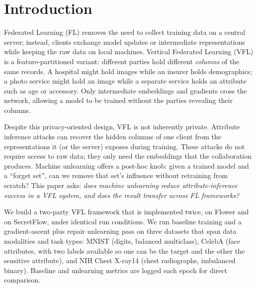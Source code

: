 \documentclass[sigconf,anonymous]{acmart}
\begin{document}


\maketitle

\section{Introduction}
Federated Learning (FL) removes the need to collect training data on a central server; instead, clients exchange model updates or intermediate representations while keeping the raw data on local machines. Vertical Federated Learning (VFL) is a feature-partitioned variant: different parties hold different \emph{columns} of the same records. A hospital might hold images while an insurer holds demographics; a photo service might hold an image while a separate service holds an attribute such as age or accessory. Only intermediate embeddings and gradients cross the network, allowing a model to be trained without the parties revealing their columns.

Despite this privacy-oriented design, VFL is not inherently private. Attribute inference attacks can recover the hidden columns of one client from the representations it (or the server) exposes during training. These attacks do not require access to raw data; they only need the embeddings that the collaboration produces. Machine unlearning offers a post-hoc knob: given a trained model and a ``forget set'', can we remove that set's influence without retraining from scratch? This paper asks: \emph{does machine unlearning reduce attribute-inference success in a VFL system, and does the result transfer across FL frameworks?}

We build a two-party VFL framework that is implemented twice, on Flower and on SecretFlow, under identical run conditions. We run baseline training and a gradient-ascent plus repair unlearning pass on three datasets that span data modalities and task types: MNIST (digits, balanced multiclass), CelebA (face attributes, with two labels available so one can be the target and the other the sensitive attribute), and NIH Chest X-ray14 (chest radiographs, imbalanced binary). Baseline and unlearning metrics are logged each epoch for direct comparison.
\end{document}
